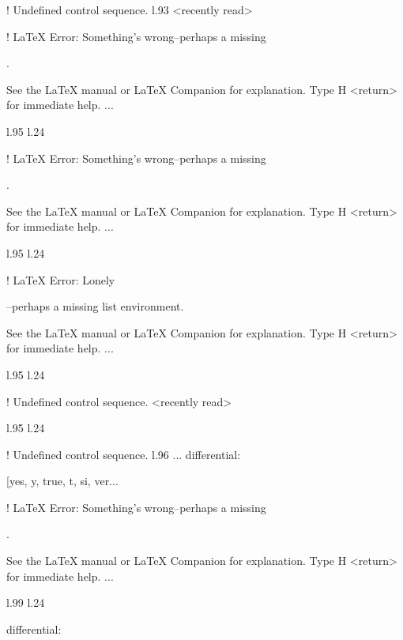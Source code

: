 {{{{{{{{{{{{{{{{{! Undefined control sequence.
l.93 <recently read> \xmlNode
                             

! LaTeX Error: Something's wrong--perhaps a missing \item.

See the LaTeX manual or LaTeX Companion for explanation.
Type  H <return>  for immediate help.
 ...                                              
                                                  
l.95 l.24     \item \xmlNode
                            

! LaTeX Error: Something's wrong--perhaps a missing \item.

See the LaTeX manual or LaTeX Companion for explanation.
Type  H <return>  for immediate help.
 ...                                              
                                                  
l.95 l.24     \item \xmlNode
                            

! LaTeX Error: Lonely \item--perhaps a missing list environment.

See the LaTeX manual or LaTeX Companion for explanation.
Type  H <return>  for immediate help.
 ...                                              
                                                  
l.95 l.24     \item \xmlNode
                            
! Undefined control sequence.
<recently read> \xmlNode 
                         
l.95 l.24     \item \xmlNode
                            
! Undefined control sequence.
l.96 ...                  {differential}: \xmlDesc
                                                  {[yes, y, true, t, si, ver...


! LaTeX Error: Something's wrong--perhaps a missing \item.

See the LaTeX manual or LaTeX Companion for explanation.
Type  H <return>  for immediate help.
 ...                                              
                                                  
l.99 l.24     \item \xmlNode
                            {differential}: \xmlDesc

}}}}}}}}}}}}}}}}}}
